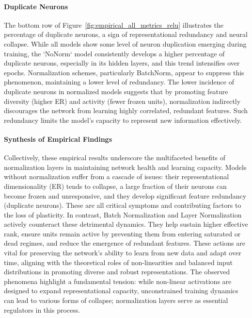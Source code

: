 \paragraph{Duplicate Neurons}
The bottom row of Figure~\ref{fig:empirical_all_metrics_relu} illustrates the percentage of duplicate neurons, a sign of representational redundancy and neural collapse. While all models show some level of neuron duplication emerging during training, the `NoNorm` model consistently develops a higher percentage of duplicate neurons, especially in its hidden layers, and this trend intensifies over epochs. Normalization schemes, particularly BatchNorm, appear to suppress this phenomenon, maintaining a lower level of redundancy. The lower incidence of duplicate neurons in normalized models suggests that by promoting feature diversity (higher ER) and activity (fewer frozen units), normalization indirectly discourages the network from learning highly correlated, redundant features. Such redundancy limits the model's capacity to represent new information effectively.

\paragraph{Synthesis of Empirical Findings}
Collectively, these empirical results underscore the multifaceted benefits of normalization layers in maintaining network health and learning capacity. Models without normalization suffer from a cascade of issues: their representational dimensionality (ER) tends to collapse, a large fraction of their neurons can become frozen and unresponsive, and they develop significant feature redundancy (duplicate neurons). These are all critical symptoms and contributing factors to the loss of plasticity. In contrast, Batch Normalization and Layer Normalization actively counteract these detrimental dynamics. They help sustain higher effective rank, ensure units remain active by preventing them from entering saturated or dead regimes, and reduce the emergence of redundant features. These actions are vital for preserving the network's ability to learn from new data and adapt over time, aligning with the theoretical roles of non-linearities and balanced input distributions in promoting diverse and robust representations. The observed phenomena highlight a fundamental tension: while non-linear activations are designed to expand representational capacity, unconstrained training dynamics can lead to various forms of collapse; normalization layers serve as essential regulators in this process.

